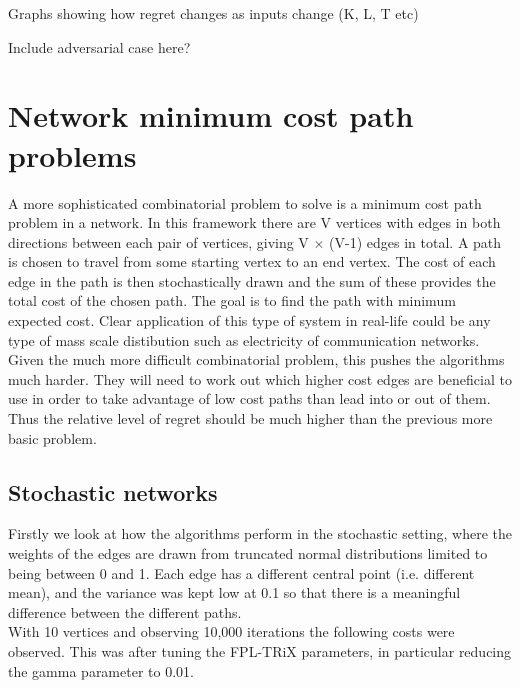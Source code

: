 Graphs showing how regret changes as inputs change (K, L, T etc)

Include adversarial case here?


\pagebreak


\section{Network minimum cost path problems}

A more sophisticated combinatorial problem to solve is a minimum cost path problem in a network. In this framework there are V vertices with edges in both directions between each pair of vertices, giving V $\times$ (V-1) edges in total. A path is chosen to travel from some starting vertex to an end vertex. The cost of each edge in the path is then stochastically drawn and the sum of these provides the total cost of the chosen path. The goal is to find the path with minimum expected cost. Clear application of this type of system in real-life could be any type of mass scale distibution such as electricity of communication networks.\\

Given the much more difficult combinatorial problem, this pushes the algorithms much harder. They will need to work out which higher cost edges are beneficial to use in order to take advantage of low cost paths than lead into or out of them. Thus the relative level of regret should be much higher than the previous more basic problem.\\

\subsection{Stochastic networks}

Firstly we look at how the algorithms perform in the stochastic setting, where the weights of the edges are drawn from truncated normal distributions limited to being between 0 and 1. Each edge has a different central point (i.e. different mean), and the variance was kept low at 0.1 so that there is a meaningful difference between the different paths.\\

With 10 vertices and observing 10,000 iterations the following costs were observed. This was after tuning the FPL-TRiX parameters, in particular reducing the gamma parameter to 0.01.\\


